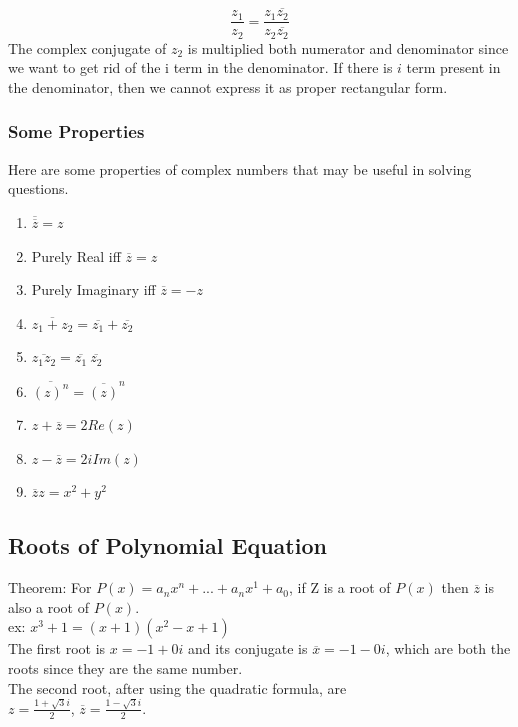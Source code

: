 \documentclass[12pt]{article}
\begin{document}
\begin{equation}
\frac{z_1}{z_2} = \frac{z_1\overline{z_2}}{z_2\overline{z_2}}
\end{equation}
The complex conjugate of $z_2$ is multiplied both numerator and denominator since we want to get rid of the i term in the denominator. If there is $i$ term present in the denominator, then we cannot express it as proper rectangular form.

\subsubsection{Some Properties}
Here are some properties of complex numbers that may be useful in solving questions.\\
\begin{enumerate}
\item $\overline{\overline{z}} = z$ 
\item Purely Real iff $\overline{z} = z$
\item Purely Imaginary iff $\overline{z} = -z$
\item $\overline{z_1+z_2} = \overline{z_1} + \overline{z_2}$
\item $\overline{z_1z_2} = \overline{z_1}\:\overline{z_2}$
\item $\overline{(z)^n} = \overline{(z)}^n$
\item $z + \overline{z} = 2Re(z)$
\item $z - \overline{z} = 2iIm(z)$
\item $\overline{z}z = x^2 + y^2$
\end{enumerate} \cite{Textbook}

\subsection{Roots of Polynomial Equation}
Theorem: For $P(x) =a_nx^n + ... + a_nx^1+a_0$, if Z is a root of $P(x)$ then $\overline{z}$ is also a root of $P(x)$.\\
ex: $x^3 + 1= (x+1)(x^2-x+1)$ \\
The first root is $x = -1 + 0i$ and its conjugate is $\overline{x} = -1 -0i$, which are both the roots since they are the same number.\\
The second root, after using the quadratic formula, are\\
$z = \frac{1+\sqrt{3}i}{2}$, $\overline{z} = \frac{1-\sqrt{3}i}{2}$.\\
\end{document}
